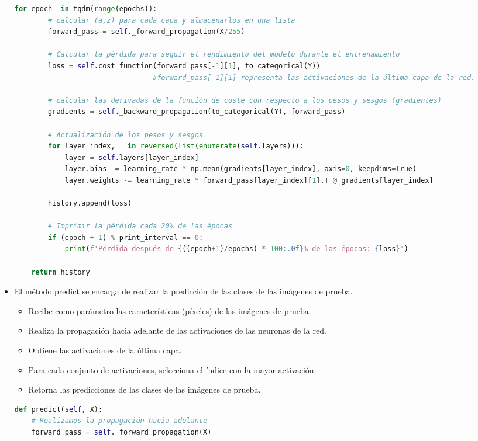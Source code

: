 \documentclass{article}
\begin{document}
\begin{itemize}
\begin{lstlisting}[language=Python, caption={Entrenamiento de la red neuronal}, label={lst:train_network}]
    for epoch  in tqdm(range(epochs)):
        # calcular (a,z) para cada capa y almacenarlos en una lista
        forward_pass = self._forward_propagation(X/255)

        # Calcular la pérdida para seguir el rendimiento del modelo durante el entrenamiento
        loss = self.cost_function(forward_pass[-1][1], to_categorical(Y))
                                 #forward_pass[-1][1] representa las activaciones de la última capa de la red.

        # calcular las derivadas de la función de coste con respecto a los pesos y sesgos (gradientes)
        gradients = self._backward_propagation(to_categorical(Y), forward_pass)

        # Actualización de los pesos y sesgos
        for layer_index, _ in reversed(list(enumerate(self.layers))):
            layer = self.layers[layer_index]
            layer.bias -= learning_rate * np.mean(gradients[layer_index], axis=0, keepdims=True)
            layer.weights -= learning_rate * forward_pass[layer_index][1].T @ gradients[layer_index]

        history.append(loss)

        # Imprimir la pérdida cada 20% de las épocas
        if (epoch + 1) % print_interval == 0:
            print(f'Pérdida después de {((epoch+1)/epochs) * 100:.0f}% de las épocas: {loss}')

    return history
        \end{lstlisting}

        \item El método predict se encarga de realizar la predicción de las clases de las imágenes de prueba.
        \begin{itemize}
            \item Recibe como parámetro las características (píxeles) de las imágenes de prueba.
            \item Realiza la propagación hacia adelante de las activaciones de las neuronas de la red.
            \item Obtiene las activaciones de la última capa.
            \item Para cada conjunto de activaciones, selecciona el índice con la mayor activación.
            \item Retorna las predicciones de las clases de las imágenes de prueba.
        \end{itemize}
        \begin{lstlisting}[language=Python, caption={Predicción de la red neuronal}, label={lst:predict_network}]
    def predict(self, X):
    # Realizamos la propagación hacia adelante
    forward_pass = self._forward_propagation(X)


\end{lstlisting}
\end{itemize}
\end{document}
